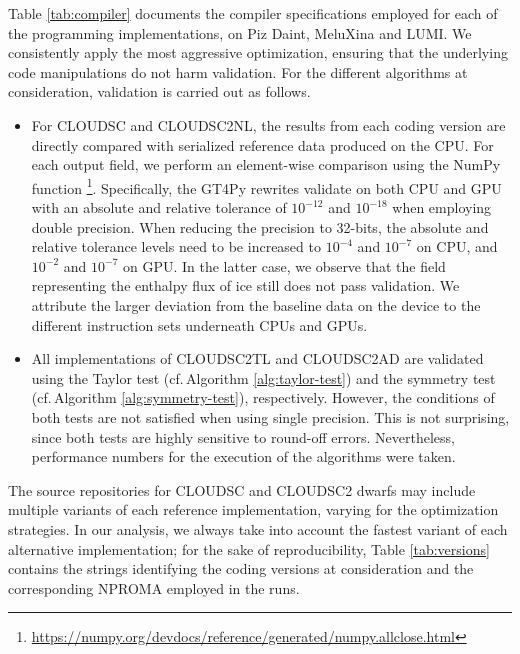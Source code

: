 \documentclass[gmd,manuscript,online]{copernicus}
\theoremstyle{theorem}
\theoremstyle{definition}
\theoremstyle{remark}
\theoremstyle{proposition}
\begin{document}
	\noindent Table \ref{tab:compiler} documents the compiler specifications employed for each of the programming implementations, on Piz Daint, MeluXina and LUMI. We consistently apply the most aggressive optimization, ensuring that the underlying code manipulations do not harm validation. For the different algorithms at consideration, validation is carried out as follows.
	\begin{itemize}
		\item For CLOUDSC and CLOUDSC2NL, the results from each coding version are directly compared with serialized reference data produced on the CPU. For each output field, we perform an element-wise comparison using the NumPy function \footnote{\url{https://numpy.org/devdocs/reference/generated/numpy.allclose.html}}. Specifically, the GT4Py rewrites validate on both CPU and GPU with an absolute and relative tolerance of $10^{-12}$ and $10^{-18}$ when employing double precision. When reducing the precision to 32-bits, the absolute and relative tolerance levels need to be increased to $10^{-4}$ and $10^{-7}$ on CPU, and $10^{-2}$ and $10^{-7}$ on GPU. In the latter case, we observe that the field representing the enthalpy flux of ice still does not pass validation. We attribute the larger deviation from the baseline data on the device to the different instruction sets underneath CPUs and GPUs.
		\item All implementations of CLOUDSC2TL and CLOUDSC2AD are validated using the Taylor test (cf.\,Algorithm \ref{alg:taylor-test}) and the symmetry test (cf.\,Algorithm \ref{alg:symmetry-test}), respectively. However, the conditions of both tests are not satisfied when using single precision. This is not surprising, since both tests are highly sensitive to round-off errors. Nevertheless, performance numbers for the execution of the algorithms were taken.
	\end{itemize}
	\noindent The source repositories for CLOUDSC and CLOUDSC2 dwarfs may include multiple variants of each reference implementation, varying for the optimization strategies. In our analysis, we always take into account the fastest variant of each alternative implementation; for the sake of reproducibility, Table \ref{tab:versions} contains the strings identifying the coding versions at consideration and the corresponding NPROMA employed in the runs.
\end{document}

